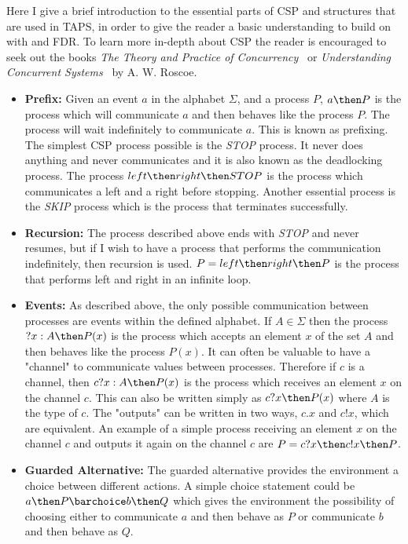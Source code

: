 Here I give a brief introduction to the essential parts of CSP and structures that are used in TAPS, in order to give the reader a basic understanding to build on with \cspm{} and FDR. To learn more in-depth about CSP the reader is encouraged to seek out the books \textit{The Theory and Practice of Concurrency}~\cite{Roscoe1997} or \textit{Understanding Concurrent Systems}~\cite{Roscoe2010} by A. W. Roscoe.
\begin{itemize}
    \item \textbf{Prefix:} Given an event $a$ in the alphabet $\Sigma$, and a process $P$, $a \then P$ is the process which will communicate $a$ and then behaves like the process $P$. The process will wait indefinitely to communicate $a$. This is known as prefixing.
    The simplest CSP process possible is the \textit{STOP} process. It never does anything and never communicates and it is also known as the deadlocking process. The process $left \then right \then STOP$ is the process which communicates a left and a right before stopping. Another essential process is the \textit{SKIP} process which is the process that terminates successfully.
    \item \textbf{Recursion:} The process described above ends with \textit{STOP} and never resumes, but if I wish to have a process that performs the communication indefinitely, then recursion is used.
    $P = left \then right \then P$ is the process that performs left and right in an infinite loop.
    \item \textbf{Events:} As described above, the only possible communication between processes are events within the defined alphabet. If $A \in \Sigma$ then the process $?x : A \then P(x)$ is the process which accepts an element $x$ of the set $A$ and then behaves like the process $P(x)$.
    It can often be valuable to have a "channel" to communicate values between processes. Therefore if $c$ is a channel, then $c?x : A \then P(x)$ is the process which receives an element $x$ on the channel $c$. This can also be written simply as $c?x \then P(x)$ where $A$ is the type of $c$. The "outputs" can be written in two ways, $c.x$ and $c!x$, which are equivalent. An example of a simple process receiving an element $x$ on the channel $c$ and outputs it again on the channel $c$ are $P = c?x \then c!x \then P$.
    \item \textbf{Guarded Alternative:} The guarded alternative provides the environment a choice between different actions. A simple choice statement could be $a \then P \barchoice b \then Q$ which gives the environment the possibility of choosing either to communicate $a$ and then behave as $P$ or communicate $b$ and then behave as $Q$.

\end{itemize}
